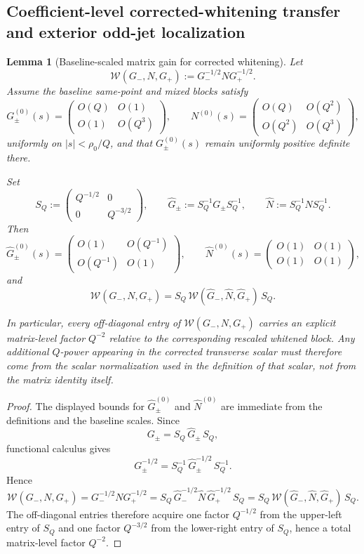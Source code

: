 \documentclass[11pt,a4paper]{amsart}
\theoremstyle{plain}
\newtheorem{lemma}[theorem]{Lemma}
\theoremstyle{definition}
\begin{document}
\subsection{Coefficient-level corrected-whitening transfer and exterior odd-jet localization}
\label{subsec:differentiated-transfer}

\begin{lemma}[Baseline-scaled matrix gain for corrected whitening]
\label{lem:baseline-scaled-matrix-gain}
Let
\[
\mathcal W(G_-,N,G_+):=G_-^{-1/2}NG_+^{-1/2}.
\]
Assume the baseline same-point and mixed blocks satisfy
\[
G_\pm^{(0)}(s)=
\begin{pmatrix}
O(Q) & O(1)\\
O(1) & O(Q^3)
\end{pmatrix},
\qquad
N^{(0)}(s)=
\begin{pmatrix}
O(Q) & O(Q^2)\\
O(Q^2) & O(Q^3)
\end{pmatrix},
\]
uniformly on $|s|<\rho_0/Q$, and that $G_\pm^{(0)}(s)$ remain uniformly
positive definite there.

Set
\[
S_Q:=\begin{pmatrix}Q^{-1/2}&0\\0&Q^{-3/2}\end{pmatrix},
\qquad
\widehat G_\pm:=S_Q^{-1}G_\pm S_Q^{-1},
\qquad
\widehat N:=S_Q^{-1}NS_Q^{-1}.
\]
Then
\[
\widehat G_\pm^{(0)}(s)=
\begin{pmatrix}
O(1)&O(Q^{-1})\\
O(Q^{-1})&O(1)
\end{pmatrix},
\qquad
\widehat N^{(0)}(s)=
\begin{pmatrix}
O(1)&O(1)\\
O(1)&O(1)
\end{pmatrix},
\]
and
\[
\mathcal W(G_-,N,G_+)
=
S_Q\,
\mathcal W(\widehat G_-,\widehat N,\widehat G_+)\,
S_Q.
\]

In particular, every off-diagonal entry of $\mathcal W(G_-,N,G_+)$ carries an
explicit matrix-level factor $Q^{-2}$ relative to the corresponding rescaled
whitened block. Any additional $Q$-power appearing in the corrected transverse
scalar must therefore come from the scalar normalization used in the definition
of that scalar, not from the matrix identity itself.
\end{lemma}

\begin{proof}
The displayed bounds for $\widehat G_\pm^{(0)}$ and $\widehat N^{(0)}$ are
immediate from the definitions and the baseline scales. Since
\[
G_\pm=S_Q\,\widehat G_\pm\,S_Q,
\]
functional calculus gives
\[
G_\pm^{-1/2}=S_Q^{-1}\,\widehat G_\pm^{-1/2}\,S_Q^{-1}.
\]
Hence
\[
\mathcal W(G_-,N,G_+)
=
G_-^{-1/2}NG_+^{-1/2}
=
S_Q\,
\widehat G_-^{-1/2}\widehat N\,\widehat G_+^{-1/2}\,
S_Q
=
S_Q\,\mathcal W(\widehat G_-,\widehat N,\widehat G_+)\,S_Q.
\]
The off-diagonal entries therefore acquire one factor $Q^{-1/2}$ from the
upper-left entry of $S_Q$ and one factor $Q^{-3/2}$ from the lower-right
entry of $S_Q$, hence a total matrix-level factor $Q^{-2}$.
\end{proof}
\end{document}
